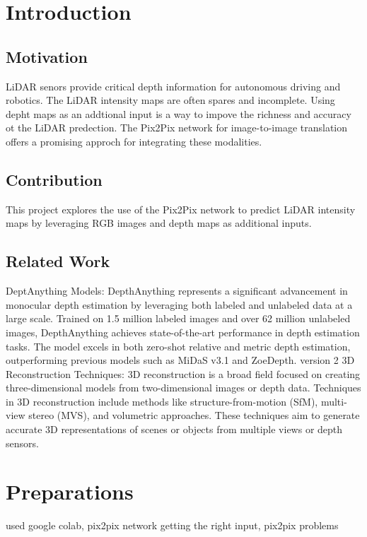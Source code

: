 \chapter{Introduction}
\label{chap:intro}

\section{Motivation}
\label{sect:motivation}
LiDAR senors provide critical depth information for autonomous driving and robotics. The LiDAR intensity maps are often spares and incomplete. Using depht maps as an addtional input is a way to impove the richness and accuracy ot the LiDAR predection. The Pix2Pix network for image-to-image translation offers a promising approch for integrating these modalities. 
\section{Contribution}
This project explores the use of the Pix2Pix network to predict LiDAR intensity maps by leveraging RGB images and depth maps as additional inputs.
\section{Related Work}
DeptAnything Models: \newline DepthAnything represents a significant advancement in monocular depth estimation by leveraging both labeled and unlabeled data at a large scale. Trained on 1.5 million labeled images and over 62 million unlabeled images, DepthAnything achieves state-of-the-art performance in depth estimation tasks. The model excels in both zero-shot relative and metric depth estimation, outperforming previous models such as MiDaS v3.1 and ZoeDepth. 
\newline
version 2
\newline
3D Reconstruction Techniques: 3D reconstruction is a broad field focused on creating three-dimensional models from two-dimensional images or depth data. Techniques in 3D reconstruction include methods like structure-from-motion (SfM), multi-view stereo (MVS), and volumetric approaches. These techniques aim to generate accurate 3D representations of scenes or objects from multiple views or depth sensors.

\chapter{Preparations}
used google colab, pix2pix network getting the right input, pix2pix problems



